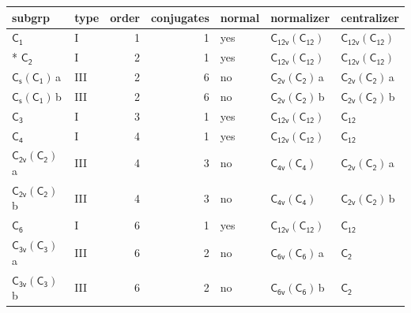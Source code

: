 \documentclass[10pt,a4paper]{article}
\numberwithin{equation}{section}
\newcommand{\grp}[1]{\mathsf{#1}}
\newcommand{\clsletter}[1]{\,{\scriptsize\color{black!55}#1}}
\begin{document}
{\small\begin{longtable}{@{}llrrlll@{}}\toprule
subgrp & type & order & conjugates & normal & normalizer & centralizer\\\midrule\endhead
\bottomrule\endfoot\endlastfoot
\href{../../../rotation/data/pdf/C1.pdf}{$\grp{C_{1}}$} & I & 1 & 1 & yes & \href{C12v-C12.pdf}{$\grp{C_{12v}}(\grp{C_{12}})$} & \href{C12v-C12.pdf}{$\grp{C_{12v}}(\grp{C_{12}})$}\\*
\href{../../../rotation/data/pdf/C2.pdf}{$\grp{C_{2}}$} & I & 2 & 1 & yes & \href{C12v-C12.pdf}{$\grp{C_{12v}}(\grp{C_{12}})$} & \href{C12v-C12.pdf}{$\grp{C_{12v}}(\grp{C_{12}})$}\\
\href{C1v-C1.pdf}{$\grp{C_{s}}(\grp{C_{1}})$}\clsletter{a} & III & 2 & 6 & no & \href{C2v-C2.pdf}{$\grp{C_{2v}}(\grp{C_{2}})$}\clsletter{a} & \href{C2v-C2.pdf}{$\grp{C_{2v}}(\grp{C_{2}})$}\clsletter{a}\\
\href{C1v-C1.pdf}{$\grp{C_{s}}(\grp{C_{1}})$}\clsletter{b} & III & 2 & 6 & no & \href{C2v-C2.pdf}{$\grp{C_{2v}}(\grp{C_{2}})$}\clsletter{b} & \href{C2v-C2.pdf}{$\grp{C_{2v}}(\grp{C_{2}})$}\clsletter{b}\\
\href{../../../rotation/data/pdf/C3.pdf}{$\grp{C_{3}}$} & I & 3 & 1 & yes & \href{C12v-C12.pdf}{$\grp{C_{12v}}(\grp{C_{12}})$} & \href{../../../rotation/data/pdf/C12.pdf}{$\grp{C_{12}}$}\\
\href{../../../rotation/data/pdf/C4.pdf}{$\grp{C_{4}}$} & I & 4 & 1 & yes & \href{C12v-C12.pdf}{$\grp{C_{12v}}(\grp{C_{12}})$} & \href{../../../rotation/data/pdf/C12.pdf}{$\grp{C_{12}}$}\\
\href{C2v-C2.pdf}{$\grp{C_{2v}}(\grp{C_{2}})$}\clsletter{a} & III & 4 & 3 & no & \href{C4v-C4.pdf}{$\grp{C_{4v}}(\grp{C_{4}})$} & \href{C2v-C2.pdf}{$\grp{C_{2v}}(\grp{C_{2}})$}\clsletter{a}\\
\href{C2v-C2.pdf}{$\grp{C_{2v}}(\grp{C_{2}})$}\clsletter{b} & III & 4 & 3 & no & \href{C4v-C4.pdf}{$\grp{C_{4v}}(\grp{C_{4}})$} & \href{C2v-C2.pdf}{$\grp{C_{2v}}(\grp{C_{2}})$}\clsletter{b}\\
\href{../../../rotation/data/pdf/C6.pdf}{$\grp{C_{6}}$} & I & 6 & 1 & yes & \href{C12v-C12.pdf}{$\grp{C_{12v}}(\grp{C_{12}})$} & \href{../../../rotation/data/pdf/C12.pdf}{$\grp{C_{12}}$}\\
\href{C3v-C3.pdf}{$\grp{C_{3v}}(\grp{C_{3}})$}\clsletter{a} & III & 6 & 2 & no & \href{C6v-C6.pdf}{$\grp{C_{6v}}(\grp{C_{6}})$}\clsletter{a} & \href{../../../rotation/data/pdf/C2.pdf}{$\grp{C_{2}}$}\\
\href{C3v-C3.pdf}{$\grp{C_{3v}}(\grp{C_{3}})$}\clsletter{b} & III & 6 & 2 & no & \href{C6v-C6.pdf}{$\grp{C_{6v}}(\grp{C_{6}})$}\clsletter{b} & \href{../../../rotation/data/pdf/C2.pdf}{$\grp{C_{2}}$}\\

\end{longtable}}
\end{document}

